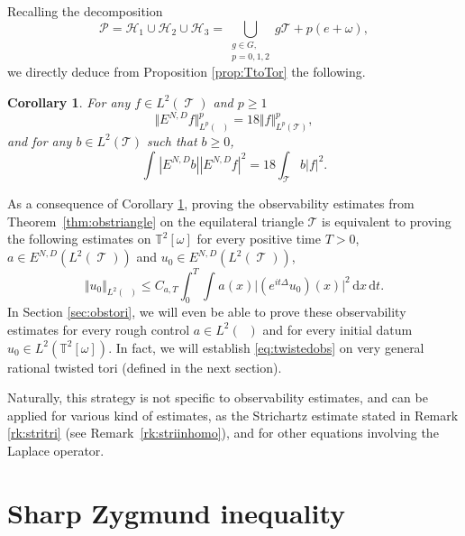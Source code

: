 \documentclass[a4paper,11pt]{amsart}
\numberwithin{equation}{section}
\newtheorem{cor}[thm]{Corollary}
\theoremstyle{definition}
\DeclareMathOperator{\var}{\mathcal T}
\DeclareMathOperator{\tori}{\mathbb T^2[\omega]}
\begin{document}
Recalling the decomposition
$$
\mathcal P = \mathcal H_1 \cup \mathcal H_2 \cup \mathcal H_3 = \bigcup_{\substack{g \in G, \\ p =0,1,2}} g\mathcal T + p(e + \omega),
$$
we directly deduce from Proposition \ref{prop:TtoTor} the following.
\begin{cor} \label{cor:red_twist}
For any $f\in L^2(\var)$ and $p\geq 1$
$$
\Vert E^{N,D}f \Vert^p_{L^p(\tori)} = 18 \Vert f \Vert^p_{L^p(\mathcal T)},
$$
and for any $b \in L^2(\mathcal T)$ such that $b \geq 0$,
$$
\int_{\tori} |E^{N,D} b| |E^{N,D} f | ^2 = 18 \int_{\mathcal T} b |f|^2.
$$
\end{cor}
As a consequence of Corollary \ref{cor:red_twist}, proving the observability estimates from Theorem~\ref{thm:obstriangle} on the equilateral triangle $\mathcal T$ is equivalent to proving the following estimates on $\mathbb T^2[\omega]$ for every positive time $T>0$, $a\in E^{N,D}(L^2(\var))$ and $u_0\in E^{N,D}(L^2(\var))$,
\begin{equation}\label{eq:twistedobs}
    \Vert u_0\Vert_{L^2(\tori)}\le C_{a,T}\int_0^T\int_{\tori}
    a(x)\big\vert(e^{it\Delta}u_0)(x)\big\vert^2\,\mathrm dx\,\mathrm dt.
\end{equation}
In Section \ref{sec:obstori}, we will even be able to prove these observability estimates for every rough control $a\in L^2(\tori)$ and for every initial datum $u_0\in L^2(\mathbb T^2[\omega])$. In fact, we will establish \eqref{eq:twistedobs} on very general rational twisted tori (defined in the next section).

Naturally, this strategy is not specific to observability estimates, and can be applied for various kind of estimates, as the Strichartz estimate stated in Remark \ref{rk:stritri} (see Remark~\ref{rk:striinhomo}), and for other equations involving the Laplace operator.

\section{Sharp Zygmund inequality} \label{ss:diamond}
\end{document}
